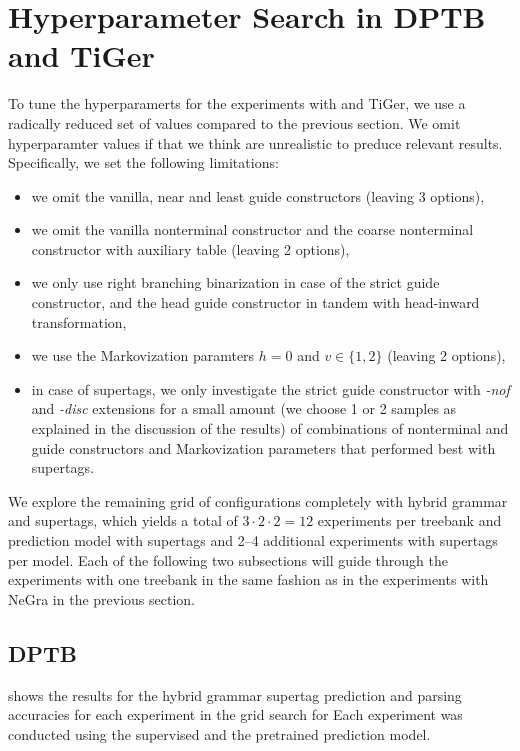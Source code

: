 \documentclass[../../document.tex]{subfiles}
\begin{document}
    \section{Hyperparameter Search in DPTB and TiGer}
    To tune the hyperparamerts for the experiments with  and TiGer, we use a radically reduced set of values compared to the previous section.
    We omit hyperparamter values if that we think are unrealistic to preduce relevant results.
    Specifically, we set the following limitations:
    \begin{itemize}
        \item we omit the vanilla, near and least guide constructors (leaving 3 options),
        \item we omit the vanilla nonterminal constructor and the coarse nonterminal constructor with auxiliary table (leaving 2 options), 
        \item we only use right branching binarization in case of the strict guide constructor, and the head guide constructor in tandem with head-inward transformation,
        \item we use the Markovization paramters \(h = 0\) and \(v \in \{1,2\}\) (leaving 2 options),
        \item in case of  supertags, we only investigate the strict guide constructor with \emph{-nof} and \emph{-disc} extensions for a small amount (we choose 1 or 2 samples as explained in the discussion of the results) of combinations of nonterminal and guide constructors and Markovization parameters that performed best with  supertags.
    \end{itemize}

    We explore the remaining grid of configurations completely with hybrid grammar and  supertags, which yields a total of $3 \cdot 2 \cdot 2 = 12$ experiments per treebank and prediction model with  supertags and 2--4 additional experiments with  supertags per model.
    Each of the following two subsections will guide through the experiments with one treebank in the same fashion as in the experiments with NeGra in the previous section.

    \subsection{DPTB}
     shows the results for the hybrid grammar supertag prediction and parsing accuracies for each experiment in the grid search for 
    Each experiment was conducted using the supervised and the pretrained prediction model.
    
\end{document}
